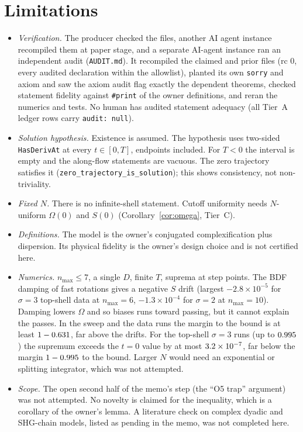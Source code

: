 \documentclass[11pt]{article}
\theoremstyle{remark}
\newcommand{\lean}[1]{\texttt{#1}}
\begin{document}
\section{Limitations}\label{sec:limits}
\begin{itemize}\itemsep1pt
\item \emph{Verification.} The producer checked the files, another AI agent instance recompiled them at paper stage, and a
separate AI-agent instance ran an independent audit (\texttt{AUDIT.md}). It recompiled the claimed and prior files (rc 0, every
audited declaration within the allowlist), planted its own \lean{sorry} and axiom and saw the axiom audit flag exactly the
dependent theorems, checked statement fidelity against \lean{\#print} of the owner definitions, and reran the numerics and
tests. No human has audited statement adequacy (all Tier~A ledger rows carry \texttt{audit: null}).
\item \emph{Solution hypothesis.} Existence is assumed. The hypothesis uses two-sided \lean{HasDerivAt} at every
$t\in[0,T]$, endpoints included. For $T<0$ the interval is empty and the along-flow statements are vacuous. The zero trajectory satisfies it (\lean{zero\_trajectory\_is\_solution}); this shows consistency,
not non-triviality.
\item \emph{Fixed $N$.} There is no infinite-shell statement. Cutoff uniformity needs $N$-uniform $\Omega(0)$ and $S(0)$
(Corollary~\ref{cor:omega}, Tier~C).
\item \emph{Definitions.} The model is the owner's conjugated complexification plus dispersion. Its physical fidelity is the
owner's design choice and is not certified here.
\item \emph{Numerics.} $n_{\max}\le7$, a single $D$, finite $T$, suprema at step points. The BDF damping of fast rotations gives a
negative $S$ drift (largest $-2.8\times10^{-5}$ for $\sigma=3$ top-shell data at $n_{\max}=6$, $-1.3\times10^{-4}$ for $\sigma=2$ at
$n_{\max}=10$). Damping lowers $\Omega$ and so biases runs toward passing, but it cannot explain the passes. In the sweep and the
data runs the margin to the bound is at least $1-0.631$, far above the drifts. For the top-shell $\sigma=3$ runs (up to
$0.995$) the supremum exceeds the $t=0$ value by at most $3.2\times10^{-7}$, far below the margin $1-0.995$ to the
bound. Larger $N$ would need an exponential or
splitting integrator, which was not attempted.
\item \emph{Scope.} The open second half of the memo's step (the ``O5 trap'' argument) was not attempted. No novelty is claimed
for the inequality, which is a corollary of the owner's lemma. A literature check on complex dyadic and SHG-chain models,
listed as pending in the memo, was not completed here.
\end{itemize}
\end{document}
